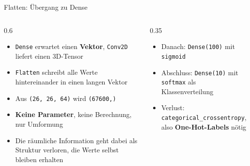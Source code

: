 \begin{frame}{Flatten: Übergang zu Dense}
\begin{columns}
\begin{column}{0.6\linewidth}
\begin{itemize}
  \item \texttt{Dense} erwartet einen \textbf{Vektor}, \texttt{Conv2D} liefert einen 3D-Tensor
  \item \texttt{Flatten} schreibt alle Werte hintereinander in einen langen Vektor
  \item Aus \texttt{(26, 26, 64)} wird \texttt{(67600,)}
  \item \textbf{Keine Parameter}, keine Berechnung, nur Umformung
  \item Die räumliche Information geht dabei als Struktur verloren, die Werte selbst bleiben erhalten
\end{itemize}
\end{column}
\begin{column}{0.35\linewidth}
\begin{itemize}
  \item Danach: \texttt{Dense(100)} mit \texttt{sigmoid}
  \item Abschluss: \texttt{Dense(10)} mit \texttt{softmax} als Klassenverteilung
  \item Verlust: \texttt{categorical\_crossentropy}, also \textbf{One-Hot-Labels} nötig
\end{itemize}
\end{column}
\end{columns}
\end{frame}

